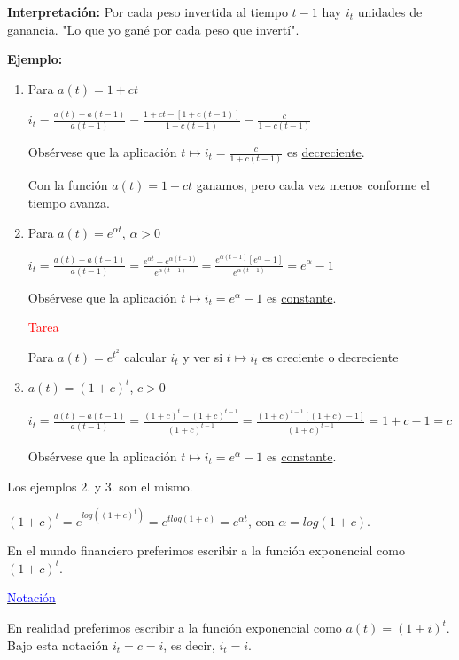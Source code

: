 \textbf{Interpretación:} Por cada peso invertida al tiempo $t-1$ hay $i_t$ unidades de ganancia. "Lo que yo gané por cada peso que invertí".

\textbf{Ejemplo:}
\begin{enumerate}
\item Para $a(t) = 1 + ct$

$i_t = \frac{a\left( t \right) - a\left( t -1 \right)}{a\left( t - 1 \right)} = \frac{1 + ct - \left[ 1 + c(t-1)\right] }{1+c(t-1)} = \frac{c}{1+c(t-1)}$

Obsérvese que la aplicación $t \longmapsto i_t = \frac{c}{1+c(t-1)}$ es \underline{decreciente}.

Con la función $a(t) = 1 + ct$ ganamos, pero cada vez menos conforme el tiempo avanza.
\item Para $a(t) = e^{\alpha t}$, $\alpha > 0$

$i_t = \frac{a\left( t \right) - a\left( t -1 \right)}{a\left( t - 1 \right)} = \frac{e^{\alpha t} - e^{\alpha (t-1)}}{e^{\alpha (t-1)}} = \frac{e^{\alpha (t-1)}\left[ e^{\alpha}-1\right]}{e^{\alpha (t-1)}} = e^{\alpha} -1$

Obsérvese que la aplicación $t \longmapsto i_t = e^{\alpha} -1$ es \underline{constante}.

\textcolor{red}{Tarea}

Para $a(t)= e^{t^2}$ calcular $i_t$ y ver si $t \longmapsto i_t$ es creciente o decreciente

\item $a(t) = (1+c)^t$, $c > 0$

$i_t =  \frac{a\left( t \right) - a\left( t -1 \right)}{a\left( t - 1 \right)} = \frac{(1+c)^t - (1+c)^{t-1}}{(1+c)^{t-1}} = \frac{(1+c)^{t-1}[(1+c)-1]}{(1+c)^{t-1}} = 1+c-1 = c $

Obsérvese que la aplicación $t \longmapsto i_t = e^{\alpha} -1$ es \underline{constante}.
\end{enumerate}

\begin{remark}
Los ejemplos 2. y 3. son el mismo.

$(1+c)^t=e^{log\left((1+c)^t \right)} = e^{tlog(1+c)}=e^{\alpha t}$, con $\alpha = log(1+c)$.

En el mundo financiero preferimos escribir a la función exponencial como $(1+c)^t$.
\end{remark}

\underline{\textcolor{blue}{Notación}}

En realidad preferimos escribir a la función exponencial como $a(t) = (1+i)^t$. Bajo esta notación $i_t = c = i$, es decir, $i_t=i$.

